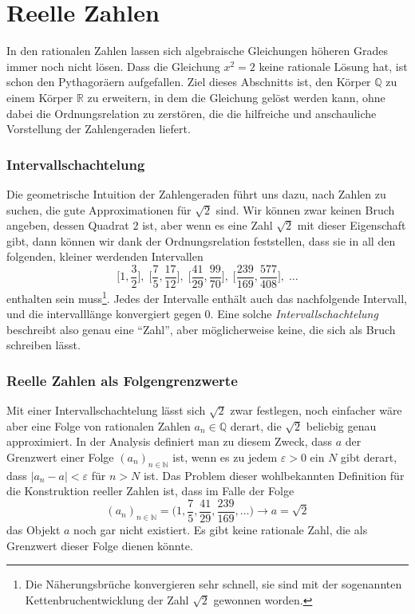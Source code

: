 %
%
%
\section{Reelle Zahlen
\label{buch:section:reelle-zahlen}}
In den rationalen Zahlen lassen sich algebraische Gleichungen höheren
Grades immer noch nicht lösen.
Dass die Gleichung $x^2=2$ keine rationale Lösung hat, ist schon den
Pythagoräern aufgefallen.
Ziel dieses Abschnitts ist, den Körper $\mathbb{Q}$ zu einem
Körper $\mathbb{R}$ zu erweitern, in dem die Gleichung
gelöst werden kann, ohne dabei die Ordnungsrelation zu zerstören, die
die hilfreiche und anschauliche Vorstellung der Zahlengeraden
liefert.
%

\subsubsection{Intervallschachtelung}
Die geometrische Intuition der Zahlengeraden führt uns dazu, nach
Zahlen zu suchen, die gute Approximationen für $\sqrt{2}$ sind.
Wir können zwar keinen Bruch angeben, dessen Quadrat $2$ ist, aber
wenn es eine Zahl $\sqrt{2}$ mit dieser Eigenschaft gibt, dann können
wir dank der Ordnungsrelation feststellen, dass sie in all den folgenden,
kleiner werdenden Intervallen
\[
\biggl[1,\frac32\biggr],\;
\biggl[\frac75,\frac{17}{12}\biggr],\;
\biggl[\frac{41}{29},\frac{99}{70}\biggr],\;
\biggl[\frac{239}{169},\frac{577}{408}\biggr],\;
\dots
\]
enthalten sein muss\footnote{Die Näherungsbrüche konvergieren sehr
schnell, sie sind mit der sogenannten Kettenbruchentwicklung der
Zahl $\sqrt{2}$ gewonnen worden.}.
Jedes der Intervalle enthält auch das nachfolgende Intervall, und
die intervalllänge konvergiert gegen 0.
Eine solche \emph{Intervallschachtelung} beschreibt also genau eine ``Zahl'',
%
aber möglicherweise keine, die sich als Bruch schreiben lässt.

\subsubsection{Reelle Zahlen als Folgengrenzwerte}
Mit einer Intervallschachtelung lässt sich $\sqrt{2}$ zwar festlegen,
noch einfacher wäre aber eine Folge von rationalen Zahlen $a_n\in\mathbb{Q}$
derart, die $\sqrt{2}$ beliebig genau approximiert.
In der Analysis definiert man zu diesem Zweck, dass $a$ der Grenzwert
einer Folge $(a_n)_{n\in\mathbb{N}}$ ist, wenn es zu jedem $\varepsilon > 0$
ein $N$ gibt derart, dass $|a_n-a|<\varepsilon$ für $n>N$ ist.
Das Problem dieser wohlbekannten Definition für die Konstruktion
reeller Zahlen ist, dass im Falle der Folge
\[
(a_n)_{n\in\mathbb{N}}=
\biggl(1,
\frac75,
\frac{41}{29},
\frac{239}{169},\dots\biggr) \to a=\sqrt{2}
\]
das Objekt $a$ noch gar nicht existiert.
Es gibt keine rationale Zahl, die als Grenzwert dieser Folge dienen
könnte.

